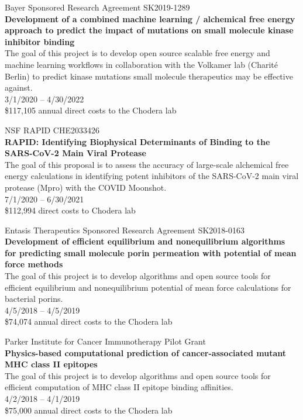 \documentclass[10pt]{article}
\begin{document}
\vspace{1.5ex}

Bayer Sponsored Research Agreement SK2019-1289 \\
{\bf Development of a combined machine learning / alchemical free energy approach to predict the impact of mutations on small molecule kinase inhibitor binding} \\
The goal of this project is to develop open source scalable free energy and machine learning workflows in collaboration with the Volkamer lab (Charit\'{e} Berlin) to predict kinase mutations small molecule therapeutics may be effective against. \\
3/1/2020 -- 4/30/2022 \\
\$117,105 annual direct costs to the Chodera lab

\vspace{1.5ex}

NSF RAPID CHE2033426\\
{\bf RAPID: Identifying Biophysical Determinants of Binding to the SARS-CoV-2 Main Viral Protease}\\
The goal of this proposal is to assess the accuracy of large-scale alchemical free energy calculations in identifying potent inhibitors of the SARS-CoV-2 main viral protease (Mpro) with the COVID Moonshot. \\
7/1/2020 -- 6/30/2021\\
\$112,994 direct costs to Chodera lab

\vspace{1.5ex}

Entasis Therapeutics Sponsored Research Agreement SK2018-0163 \\
{\bf Development of efficient equilibrium and nonequilibrium algorithms for predicting small molecule porin permeation with potential of mean force methods} \\
The goal of this project is to develop algorithms and open source tools for efficient equilibrium and nonequilibrium potential of mean force calculations for bacterial porins.\\
4/5/2018 -- 4/5/2019 \\
\$74,074 annual direct costs to the Chodera lab

\vspace{1.5ex}

Parker Institute for Cancer Immunotherapy Pilot Grant \\
{\bf Physics-based computational prediction of cancer-associated mutant MHC class II epitopes} \\
The goal of this project is to develop algorithms and open source tools for efficient computation of MHC class II epitope binding affinities.\\
4/2/2018 -- 4/1/2019 \\
\$75,000 annual direct costs to the Chodera lab
\end{document}
